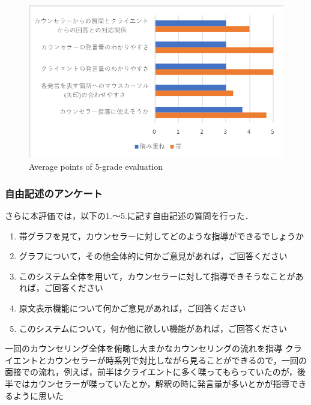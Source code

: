 \documentclass[shuuron]{kuee}
\begin{document}
\begin{figure}
   \begin{center}
     \includegraphics[width=\linewidth]{keijouAnketo.png}
   \end{center}
   \caption{Average points of 5-grade evaluation}
   \label{fig:keijouAnketo}
 \end{figure}


\subsubsection{自由記述のアンケート}

さらに本評価では，以下の1.〜5.に記す自由記述の質問を行った．

\begin{enumerate}
\item 帯グラフを見て，カウンセラーに対してどのような指導ができるでしょうか
\item グラフについて，その他全体的に何かご意見があれば，ご回答ください
\item このシステム全体を用いて，カウンセラーに対して指導できそうなことがあれば，ご回答ください
\item 原文表示機能について何かご意見があれば，ご回答ください
\item このシステムについて，何か他に欲しい機能があれば，ご回答ください
 \end{enumerate}

  一回のカウンセリング全体を俯瞰し大まかなカウンセリングの流れを指導
  クライエントとカウンセラーが時系列で対比しながら見ることができるので，一回の面接での流れ，例えば，前半はクライエントに多く喋ってもらっていたのが，後半ではカウンセラーが喋っていたとか，解釈の時に発言量が多いとかが指導できるように思いた
\end{document}
